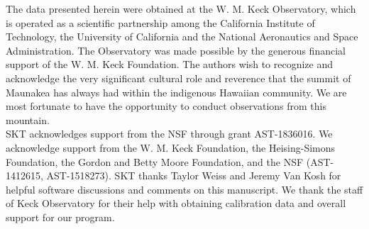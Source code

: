 \documentclass[]{spie}  %
\begin{document}
\acknowledgments

The data presented herein were obtained at the W. M. Keck Observatory, which is operated as a scientific partnership among the California Institute of Technology, the University of California and the National Aeronautics and Space Administration.
The Observatory was made possible by the generous financial support of the W. M. Keck Foundation.
The authors wish to recognize and acknowledge the very significant cultural role and reverence that the summit of Maunakea has always had within the indigenous Hawaiian community.
We are most fortunate to have the opportunity to conduct observations from this mountain.
\\
\indent SKT acknowledges support from the NSF through grant AST-1836016. We acknowledge support from the W. M. Keck Foundation, the Heising-Simons Foundation, the Gordon and Betty Moore Foundation, and the NSF (AST-1412615, AST-1518273). SKT thanks Taylor Weiss and Jeremy Van Kosh for helpful software discussions and comments on this manuscript. We thank the staff of Keck Observatory for their help with obtaining calibration data and overall support for our program.

\end{document}
